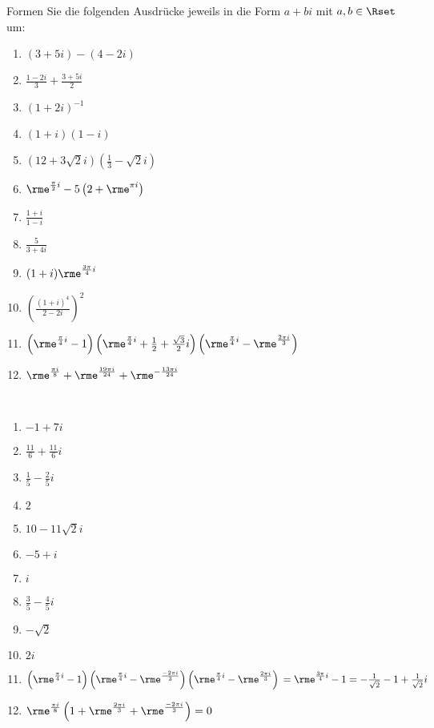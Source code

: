 \documentclass[12pt]{exam}
\begin{document}
\begin{questions}
Formen Sie die folgenden Ausdrücke jeweils in die Form $a+bi$ mit $a,b\in\Rset$ um:\\
\parbox{0.4\textwidth}{\begin{enumerate}
		\item $(3+5i)-(4-2i)$
		\item $\frac{1-2i}{3}+\frac{3+5i}{2}$
		\item $(1+2i)^{-1}$
		\item $(1+i)(1-i)$
		\item $(12+3\sqrt{2}i)\left(\frac{1}{3}-\sqrt{2}i\right)$
		\item $\rme^{\frac{\pi}{2}i}-5\left(2+\rme^{\pi i}\right)$
		\item $\frac{1+i}{1-i}$
\end{enumerate}}\parbox{0.6\textwidth}{\begin{enumerate}\setcounter{enumi}{7}
		\item $\frac{5}{3+4i}$
		\item $(1+i)\rme^{\frac{3\pi}{4}i}$
		\item $\left(\frac{(1+i)^4}{2-2i}\right)^2$
		\item $\left(\rme^{\frac{\pi}{4}i}-1\right)\left(\rme^{\frac{\pi}{4}i}+\frac{1}{2}+\frac{\sqrt{3}}{2}i\right)\left(\rme^{\frac{\pi}{4}i}-\rme^{\frac{2\pi i}{3}}\right)$
		\item $\rme^{\frac{\pi i}{8}}+\rme^{\frac{19\pi i}{24}}+\rme^{-\frac{13\pi i}{24}}$
\end{enumerate}}
\begin{solution}\\
	\parbox{0.4\textwidth}{\begin{enumerate}
			\item $-1+7i$
			\item $\frac{11}{6}+\frac{11}{6}i$
			\item $\frac{1}{5}-\frac{2}{5}i$
			\item $2$
			\item $10-11\sqrt{2}i$
			\item $-5+i$
			\item $i$
	\end{enumerate}}\parbox{0.6\textwidth}{\begin{enumerate}\setcounter{enumi}{7}
			\item $\frac{3}{5}-\frac{4}{5}i$
			\item $-\sqrt{2}$
			\item $2i$
			\item $\left(\rme^{\frac{\pi}{4}i}-1\right)\left(\rme^{\frac{\pi}{4}i}-\rme^{\frac{-2\pi i}{3}}\right)\left(\rme^{\frac{\pi}{4}i}-\rme^{\frac{2\pi i}{3}}\right)\\=\rme^{\frac{3\pi}{4}i}-1=-\frac{1}{\sqrt{2}}-1+\frac{1}{\sqrt{2}}i$
			\item $\rme^{\frac{\pi i}{8}}\left(1+\rme^{\frac{2\pi i}{3}}+\rme^{\frac{-2\pi i}{3}}\right)=0$
	\end{enumerate}}
\end{solution}




\end{questions}
\end{document}
